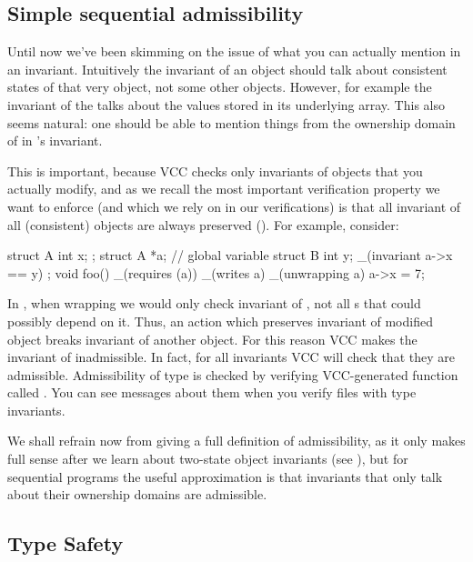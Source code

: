 \subsection{Simple sequential admissibility}
\label{sect:admissibility0}

Until now we've been skimming on the issue of what you can actually
mention in an invariant. 
Intuitively the invariant of an object should talk about consistent states
of that very object, not some other objects.
However, for example the invariant of the  
talks about the values stored in its underlying array.
This also seems natural: one should be able to mention things
from the ownership domain of  in 's invariant.

This is important, because VCC checks only invariants of objects
that you actually modify, and as we recall the most important
verification property we want to enforce (and which we rely on in our
verifications) is that all invariant of all (consistent) objects 
are always preserved ().
For example, consider:

\begin{VCC}
struct A { int x; };
struct A *a; // global variable
struct B {
  int y;
  _(invariant a->x == y)
};
void foo()
  _(requires \wrapped(a))
  _(writes a)
{
  _(unwrapping a) { a->x = 7; }
}
\end{VCC}

\noindent
In , when wrapping  we would only check invariant
of , not all s that could possibly depend on it.
Thus, an action which preserves invariant of modified object breaks invariant of another object.
For this reason VCC makes the invariant of  inadmissible.
In fact, for all invariants VCC will check that they are admissible.
Admissibility of type  is checked by verifying VCC-generated
function called .
You can see messages about them when you verify files with type
invariants.

We shall refrain now from giving a full definition of admissibility, as 
it only makes full sense after we learn about two-state object invariants
(see ), but for sequential programs the useful approximation
is that invariants that only talk about their ownership domains are admissible.


\subsection{Type Safety}
\label{sect:type-safety}

